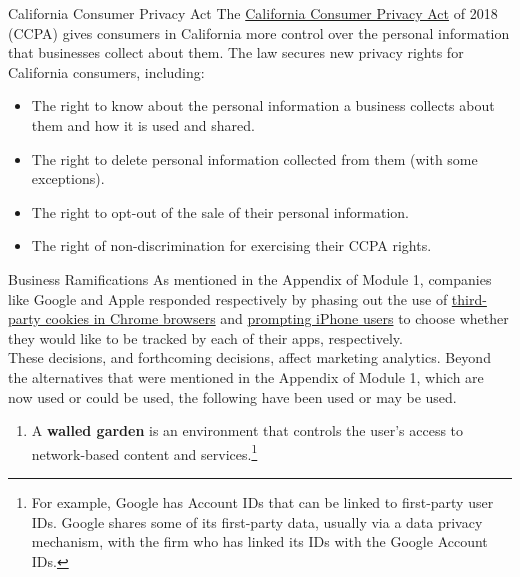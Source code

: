 \documentclass[pdf]{beamer}
\newcommand{\empr}[1]{{\color{franklinblue}\textbf{#1}}}
\theoremstyle{remark}
\theoremstyle{definition}
\begin{document}
\begin{frame}[t]{California Consumer Privacy Act}
The \href{https://oag.ca.gov/privacy/ccpa}{California Consumer Privacy Act} of 2018 (CCPA) gives consumers in California more control over the personal information that businesses collect about them. The law secures new privacy rights for California consumers, including:\\
\vspace{1.5ex}
\begin{itemize}
  \item The right to know about the personal information a business collects about them and how it is used and shared.
  \item The right to delete personal information collected from them (with some exceptions).
  \item The right to opt-out of the sale of their personal information.
  \item The right of non-discrimination for exercising their CCPA rights.
\end{itemize}
\end{frame}

\begin{frame}[t]{Business Ramifications}
 As mentioned in the Appendix of Module 1, companies like Google and Apple responded respectively by phasing out the use of \href{https://blog.google/products/chrome/update-testing-privacy-sandbox-web/}{third-party cookies in Chrome browsers} and \href{https://support.apple.com/en-us/HT212025}{prompting iPhone users} to choose whether they would like to be tracked by each of their apps, respectively. %
 \\
 \vspace{1.5ex} 
 These decisions, and forthcoming decisions, affect marketing analytics.  Beyond the alternatives that were mentioned in the Appendix of Module 1, which are now used or could be used, the following have been used or may be used.
\begin{enumerate}
  \item A \empr{walled garden} is an environment that controls the user's access to network-based content and services.\footnote{For example, Google has Account IDs that can be linked to first-party user IDs.  Google shares some of its first-party data, usually via a data privacy mechanism, with the firm who has linked its IDs with the Google Account IDs.}
\end{enumerate}
\end{frame}
\end{document}
